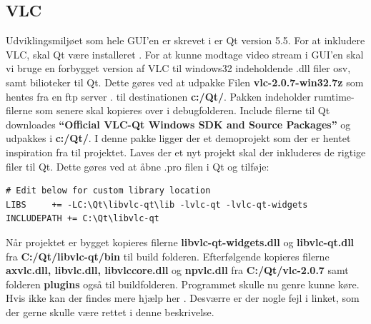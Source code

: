 \subsection{VLC}
Udviklingsmiljøet som hele GUI'en er skrevet i er Qt version 5.5. For at inkludere VLC, skal Qt være installeret \cite{lib:qt}. For at kunne modtage video stream i GUI'en skal vi bruge en forbygget version af VLC til windows32 indeholdende .dll filer osv, samt bilioteker til Qt. Dette gøres ved at udpakke Filen \textbf{vlc-2.0.7-win32.7z} som hentes fra en ftp server \cite{lib:vlc-ftp}. til destinationen \textbf{c:/Qt/}. Pakken indeholder rumtime-filerne som senere skal kopieres over i debugfolderen. Include filerne til Qt downloades \textbf{“Official VLC-Qt Windows SDK and Source Packages”} \cite{lib:vlc-qt} og udpakkes i \textbf{c:/Qt/}. I denne pakke ligger der et demoprojekt som der er hentet inspiration fra til projektet. Laves der et nyt projekt skal der inkluderes de rigtige filer til Qt. Dette gøres ved at åbne .pro filen i Qt og tilføje:

\begin{lstlisting}
# Edit below for custom library location
LIBS     += -LC:\Qt\libvlc-qt\lib -lvlc-qt -lvlc-qt-widgets
INCLUDEPATH += C:\Qt\libvlc-qt
\end{lstlisting}
Når projektet er bygget kopieres filerne \textbf{libvlc-qt-widgets.dll} og \textbf{libvlc-qt.dll} fra \textbf{C:/Qt/libvlc-qt/bin} til build folderen. Efterfølgende kopieres filerne \textbf{axvlc.dll, libvlc.dll, libvlccore.dll} og \textbf{npvlc.dll} fra \textbf{C:/Qt/vlc-2.0.7} samt folderen \textbf{plugins} også til buildfolderen. Programmet skulle nu genre kunne køre. Hvis ikke kan der findes mere hjælp her \cite{lib:vlc-using-qt}. Desværre er der nogle fejl i linket, som der gerne skulle være rettet i denne beskrivelse. 